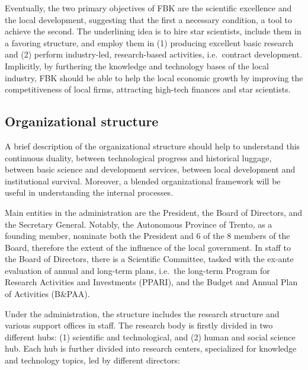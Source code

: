 Eventually, the two primary objectives of FBK are the scientific excellence and the local development, suggesting that the first a necessary condition, a tool to achieve the second. The underlining idea is to hire star scientists, include them in a favoring structure, and employ them in (1) producing excellent basic research and (2) perform industry-led, research-based activities, i.e.\ contract development. Implicitly, by furthering the knowledge and technology bases of the local industry, FBK should be able to help the local economic growth by improving the competitiveness of local firms, attracting high-tech finances and star scientists.

\subsection{Organizational structure}

A brief description of the organizational structure should help to understand this continuous duality, between technological progress and historical luggage, between basic science and development services, between local development and institutional survival. Moreover, a blended organizational framework will be useful in understanding the internal processes. 

Main entities in the administration are the President, the Board of Directors, and the Secretary General. Notably, the Autonomous Province of Trento, as a founding member, nominate both the President and 6 of the 8 members of the Board, therefore the extent of the influence of the local government. In staff to the Board of Directors, there is a Scientific Committee, tasked with the ex-ante evaluation of annual and long-term plans, i.e.\ the long-term Program for Research Activities and Investments (PPARI), and the Budget and Annual Plan of Activities (B\&PAA).

Under the administration, the structure includes the research structure and various support offices in staff. The research body is firstly divided in two different hubs: (1) scientific and technological, and (2) human and social science hub. Each hub is further divided into research centers, specialized for knowledge and technology topics, led by different directors:

